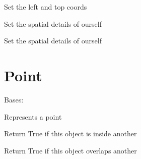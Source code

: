 \documentclass[letterpaper,10pt,english]{sphinxmanual}
\begin{document}
\begin{fulllineitems}
\begin{fulllineitems}
\label{geometry:serge.geometry.Rectangle.setOrigin}
Set the left and top coords

\end{fulllineitems}


\begin{fulllineitems}
\label{geometry:serge.geometry.Rectangle.setSpatial}
Set the spatial details of ourself

\end{fulllineitems}


\begin{fulllineitems}
\label{geometry:serge.geometry.Rectangle.setSpatialCentered}
Set the spatial details of ourself

\end{fulllineitems}


\end{fulllineitems}



\section{Point}
\label{geometry:point}

\begin{fulllineitems}
\label{geometry:serge.geometry.Point}
Bases: {\hyperref[geometry:serge.geometry.Rectangle]{}}

Represents a point

\begin{fulllineitems}
\label{geometry:serge.geometry.Point.isInside}
Return True if this object is inside another

\end{fulllineitems}


\begin{fulllineitems}
\label{geometry:serge.geometry.Point.isOverlapping}
Return True if this object overlaps another

\end{fulllineitems}


\end{fulllineitems}
\end{document}
